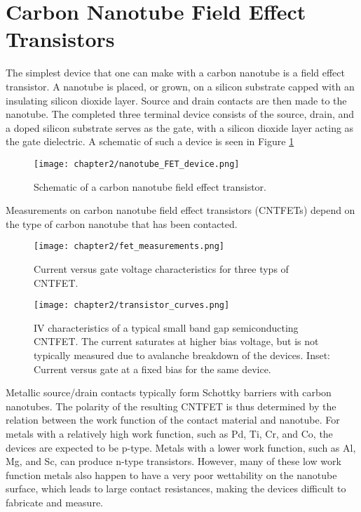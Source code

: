 \section{Carbon Nanotube Field Effect Transistors}

The simplest device that one can make with a carbon nanotube is a field effect transistor. A nanotube is placed, or grown, on a silicon substrate capped with an insulating silicon dioxide layer. Source and drain contacts are then made to the nanotube. The completed three terminal device consists of the source, drain, and a doped silicon substrate serves as the gate, with a silicon dioxide layer acting as the gate dielectric. A schematic of such a device is seen in Figure \ref{fig:nanotube_fet}

\begin{figure}
    \centering
    \texttt{[image: chapter2/nanotube\_FET\_device.png]}
    \caption{Schematic of a carbon nanotube field effect transistor.}
    \label{fig:nanotube_fet}
\end{figure}

Measurements on carbon nanotube field effect transistors (CNTFETs) depend on the type of carbon nanotube that has been contacted.

\begin{figure}
    \centering
    \texttt{[image: chapter2/fet\_measurements.png]}
    \caption{Current versus gate voltage characteristics for three typs of CNTFET.}
    \label{fig:fet_measurements}
\end{figure}

\begin{figure}
    \centering
    \texttt{[image: chapter2/transistor\_curves.png]}
    \caption{IV characteristics of a typical small band gap semiconducting CNTFET. The current saturates at higher bias voltage, but is not typically measured due to avalanche breakdown of the devices. Inset: Current versus gate at a fixed bias for the same device.}
    \label{transistor_curves.png}
\end{figure}

Metallic source/drain contacts typically form Schottky barriers with carbon nanotubes. The polarity of the resulting CNTFET is thus determined by the relation between the work function of the contact material and nanotube. For metals with a relatively high work function, such as Pd, Ti, Cr, and Co, the devices are expected to be p-type. Metals with a lower work function, such as Al, Mg, and Sc, can produce n-type transistors. However, many of these low work function metals also happen to have a very poor wettability on the nanotube surface, which leads to large contact resistances, making the devices difficult to fabricate and measure.

